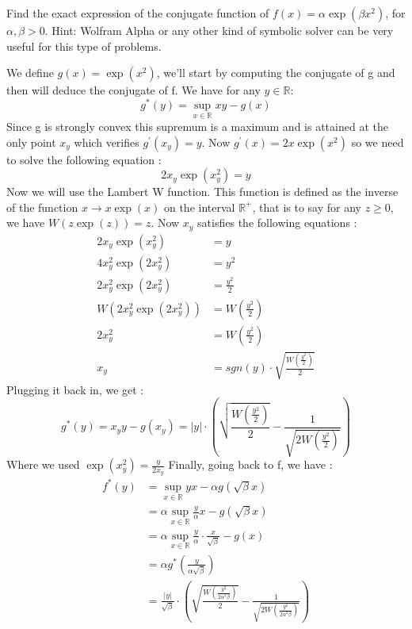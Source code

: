 \begin{exercise}[]{}
	Find the exact expression of the conjugate function of $ f(x) = \alpha \exp{(\beta x^2)} $, for $ \alpha, \beta >0 $. Hint: Wolfram Alpha or any other kind of symbolic solver can be very useful for this type of problems.
\end{exercise}

\begin{solution}[]
	We define $ g(x) = \exp{(x^2)} $, we'll start by computing the conjugate of g and then will deduce the conjugate of f. We have for any $ y \in \mathbb{R} $:
\begin{equation*}
	g^{*}(y) = \sup_{x\in \mathbb{R}} xy - g(x)
\end{equation*}
Since g is strongly convex this supremum is a maximum and is attained at the only point $ x_y $ which verifies $ g^{\prime}(x_y) = y $. Now $ g^{\prime}(x) = 2x \exp{(x^2)} $ so we need to solve the following equation :
\begin{equation*}
	2x_y\exp{(x_y^2)} = y
\end{equation*}
Now we will use the Lambert W function. This function is defined as the inverse of the function $ x \rightarrow x \exp{(x)} $ on the interval $ \mathbb{R}^+ $, that is to say for any $ z\geq 0 $, we have $ W(z \exp{(z)}) = z $.
Now $ x_y $ satisfies the following equations :
\begin{align*}
	2x_y \exp{(x_y^2)} &= y \\
	4x_y^2 \exp{(2x_y^2)} &= y^2 \\
	2 x_y^2 \exp{(2x_y^2)} &= \frac{y^2}{2} \\
	W(2 x_y^2 \exp{(2x_y^2)}) &= W(\frac{y^2}{2}) \\
	2 x_y^2 &= W(\frac{y^2}{2}) \\
	x_y &= sgn(y)\cdot \sqrt{\frac{W(\frac{y^2}{2})}{2}}
\end{align*}
Plugging it back in, we get :
\begin{equation*}
	g^{*}(y) = x_y y - g(x_y) = |y|\cdot \left( \sqrt{\frac{W(\frac{y^2}{2})}{2}} - \frac{1}{\sqrt{2W(\frac{y^2}{2})}}  \right)
\end{equation*}
Where we used $ \exp{(x_y^2)} = \frac{y}{2x_y} $
Finally, going back to f, we have :
\begin{align*}
	f^{*}(y) &= \sup_{x\in \mathbb{R}}yx - \alpha g(\sqrt{\beta}x) \\
		 &= \alpha\sup_{x \in \mathbb{R}} \frac{y}{\alpha}x - g(\sqrt{\beta}x) \\
		 &= \alpha \sup_{x \in \mathbb{R}} \frac{y}{\alpha}\cdot \frac{x}{\sqrt{\beta}} - g(x)\\
		 &= \alpha g^{*}(\frac{y}{\alpha \sqrt{\beta}}) \\
		 &= \frac{|y|}{\sqrt{\beta}}\cdot \left( \sqrt{\frac{W(\frac{y^2}{2 \alpha^2 \beta})}{2}} - \frac{1}{\sqrt{2W(\frac{y^2}{2 \alpha^2 \beta})}} \right)
\end{align*}

\end{solution}
